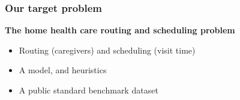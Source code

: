 \begin{frame}
   \frametitle{Our target problem}

   \textbf{The home health care routing and scheduling problem}
   \begin{itemize}
      \item Routing (caregivers) and scheduling (visit time)
      \item A model, and heuristics
      \item A public standard benchmark dataset
   \end{itemize}



\end{frame}



%
%
%
%
%

